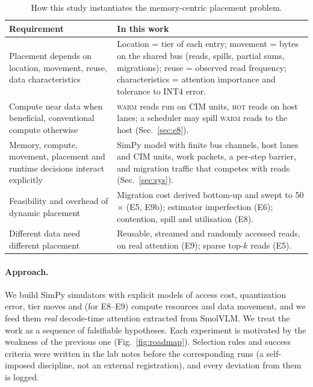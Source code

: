 \documentclass[10pt,a4paper]{article}
\newcommand{\hot}{\textsc{hot}}
\newcommand{\warm}{\textsc{warm}}
\begin{document}
\begin{table}[t]
\centering\small
\caption{How this study instantiates the memory-centric placement problem.}
\label{tab:map}
\begin{tabular}{>{\raggedright\arraybackslash}p{4.0cm}>{\raggedright\arraybackslash}p{11.4cm}}
\toprule
Requirement & In this work\\
\midrule
Placement depends on location, movement, reuse, data characteristics &
Location = tier of each entry; movement = bytes on the shared bus (reads, spills, partial sums, migrations); reuse = observed read frequency; characteristics = attention importance and tolerance to INT4 error.\\
Compute near data when beneficial, conventional compute otherwise &
\warm{} reads run on CIM units, \hot{} reads on host lanes; a scheduler may spill \warm{} reads to the host (Sec.~\ref{sec:e8}).\\
Memory, compute, movement, placement and runtime decisions interact explicitly &
SimPy model with finite bus channels, host lanes and CIM units, work packets, a per-step barrier, and migration traffic that competes with reads (Sec.~\ref{sec:sys}).\\
Feasibility and overhead of dynamic placement &
Migration cost derived bottom-up and swept to 50$\times$ (E5, E9b); estimator imperfection (E6); contention, spill and utilisation (E8).\\
Different data need different placement &
Reusable, streamed and randomly accessed reads, on real attention (E9); sparse top-$k$ reads (E5).\\
\bottomrule
\end{tabular}
\end{table}

\paragraph{Approach.} We build SimPy simulators with explicit models of access cost, quantization error, tier moves and (for E8--E9) compute resources and data movement, and we feed them \emph{real} decode-time attention extracted from SmolVLM. We treat the work as a sequence of falsifiable hypotheses. Each experiment is motivated by the weakness of the previous one (Fig.~\ref{fig:roadmap}). Selection rules and success criteria were written in the lab notes before the corresponding runs (a self-imposed discipline, not an external registration), and every deviation from them is logged.
\end{document}

